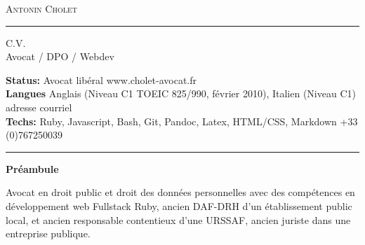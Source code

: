 \documentclass[10pt,A4]{article}
\newcommand{\cvsection}[1]
{
	\begin{center}
		\large\textcolor{sectcol}{\textbf{#1}}
	\end{center}
}
\newcommand{\metasection}[2]
{
\footnotesize{#2} \hspace*{\fill} \footnotesize{#1}\\[1pt]
}
\begin{document}
\pagestyle{fancy}	








\vspace{-8pt}
\begin{center}
	\Huge \textsc{Antonin Cholet} \textcolor{sectcol}{\rule[-1mm]{1mm}{0.9cm}} \textsc{C.V.}\\[2pt]
	\small Avocat / DPO / Webdev
\end{center}



\vspace{6pt}


\metasection{www.cholet-avocat.fr}{\textbf{Status:} Avocat libéral}
\metasection{adresse courriel}{\textbf{Langues} Anglais (Niveau C1 TOEIC 825/990, février 2010), Italien (Niveau C1)}
\metasection{+33 (0)767250039}{\textbf{Techs:} Ruby, Javascript, Bash, Git, Pandoc, Latex, HTML/CSS, Markdown}
\vspace{-2pt}
\textcolor{softcol}{\hrule}
\vspace{6pt}

\normalsize

\vspace{-6pt}
\cvsection{Préambule}
Avocat en droit public et droit des données personnelles avec des compétences en développement web Fullstack Ruby, ancien DAF-DRH d’un établissement public local, et ancien responsable contentieux d’une URSSAF, ancien juriste dans une entreprise publique.\\
\end{document}
